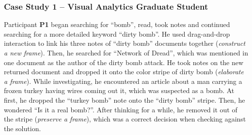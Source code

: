 

\subsubsection{Case Study 1 -- Visual Analytics Graduate Student}
Participant \textbf{P1} began searching for ``bomb'', read, took notes and continued searching for a more detailed keyword ``dirty bomb''. He used drag-and-drop interaction to link his three notes of ``dirty bomb'' documents together (\textit{construct a new frame}). Then, he searched for ``Network of Dread'', which was mentioned in one document as the author of the dirty bomb attack. He took notes on the new returned document and dropped it onto the color stripe of dirty bomb (\textit{elaborate a frame}). While investigating, he encountered an article about a man carrying a frozen turkey having wires coming out it, which was suspected as a bomb. At first, he dropped the ``turkey bomb'' note onto the ``dirty bomb'' stripe. Then, he wondered ``Is it a real bomb?''. After thinking for a while, he removed it out of the stripe (\textit{preserve a frame}), which was a correct decision when checking against the solution.

